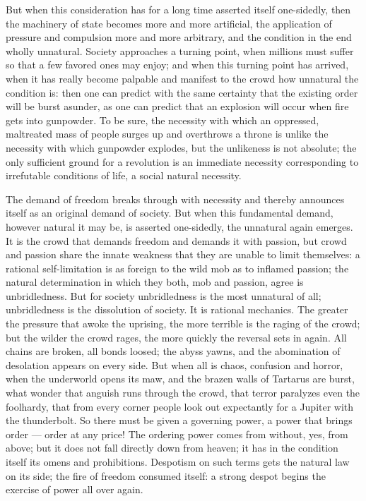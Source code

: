 \documentclass[12pt,a4paper,openany]{book}
\newcommand{\opage}[1]{\marginnote{\footnotesize\textit{[#1]}}}
\begin{document}
But when this consideration has for a long time asserted itself
one-sidedly, then the machinery of state becomes more and
more artificial, the application of pressure and compulsion more and
more arbitrary, and the condition in the end wholly unnatural.
Society approaches a turning point, when millions
must suffer so that a few favored ones may enjoy;
\setcounter{footnote}{0}%
\opage{292}and when this turning point has arrived, when it has really
become palpable and manifest to the crowd how unnatural
the condition is: then one can predict with the same certainty
that the existing order will be burst asunder, as
one can predict that an explosion will occur when
fire gets into gunpowder. To be sure, the necessity with which
an oppressed, maltreated mass of people surges up and
overthrows a throne is unlike the necessity with which
gunpowder explodes, but the unlikeness is not absolute;
the only sufficient ground for a revolution
is an immediate necessity corresponding to irrefutable conditions of life,
a social natural necessity.

The demand of freedom breaks through with necessity
and thereby announces itself as an original demand of society.
But when this fundamental demand, however natural
it may be, is asserted one-sidedly, the unnatural
again emerges. It is the crowd that demands freedom
and demands it with passion, but crowd and passion
share the innate weakness that they are unable
to limit themselves: a rational self-limitation is
as foreign to the wild mob as to inflamed
passion; the natural determination in which they both,
mob and passion, agree is unbridledness.
But for society unbridledness is the most unnatural
of all; unbridledness is the dissolution of society. It
is rational mechanics. The greater the pressure that awoke
the uprising, the more terrible is the raging of the crowd; but
the wilder the crowd rages, the more quickly the reversal
sets in again. All chains are broken, all bonds loosed;
the abyss yawns, and the abomination of desolation appears on
\setcounter{footnote}{0}%
\opage{293}every side. But when all is chaos, confusion and
horror, when the underworld opens its maw, and the brazen walls
of Tartarus are burst, what wonder that anguish
runs through the crowd, that terror paralyzes even the foolhardy,
that from every corner people look out expectantly for
a Jupiter with the thunderbolt. So there must be given
a governing power, a power that brings order --- order
at any price! The ordering power comes from without,
yes, from above; but it does not fall directly down from
heaven; it has in the condition itself its omens and prohibitions.
Despotism on such terms gets the natural law
on its side; the fire of freedom consumed itself: a strong despot begins the exercise of power all over again.  %
\end{document}
